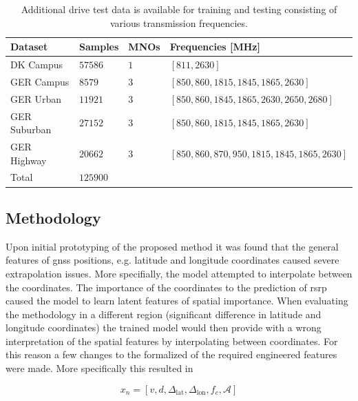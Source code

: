 \begin{table}[h]
\footnotesize
\begin{tabular}{@{}llll@{}}
\toprule
Dataset      & Samples & MNOs & Frequencies  [MHz]       \\ \midrule
DK Campus    & $57586$   & $1$    & $[811, 2630]$ \\
GER Campus   & $8579$    & $3$    & $[850, 860, 1815, 1845, 1865, 2630]$                   \\
GER Urban    & $11921$   & $3$    &  $[850, 860, 1845, 1865, 2630, 2650, 2680]$ \\
GER Suburban & $27152$   & $3$    &  $[850, 860, 1815, 1845, 1865,2630]$                   \\
GER Highway  & $20662$   & $3$    & $[850, 860, 870, 950, 1815, 1845, 1865,2630]$                    \\ \midrule
Total        & $125900$  &      &                     \\ \bottomrule
\end{tabular}
\vspace{1em}
\caption{Additional drive test data is available for training and testing consisting of various transmission frequencies.}\label{tab:drive_test_data_total}
\end{table}

\subsection{Methodology}

Upon initial prototyping of the proposed method it was found that the general features of \gls{gnss} positions, e.g. latitude and longitude coordinates caused severe extrapolation issues. More specifially, the model attempted to interpolate between the coordinates. The importance of the coordinates to the prediction of \gls{rsrp} caused the model to learn latent features of spatial importance. When evaluating the methodology in a different region (significant difference in latitude and longitude coordinates) the trained model would then provide with a wrong interpretation of the spatial features by interpolating between coordinates. For this reason a few changes to the formalized of the required engineered features were made. More specifically this resulted in

\begin{equation}
    x_n = [v, d, \Delta_\text{lat}, \Delta_\text{lon},  f_c, \mathcal{A}]
\end{equation}

